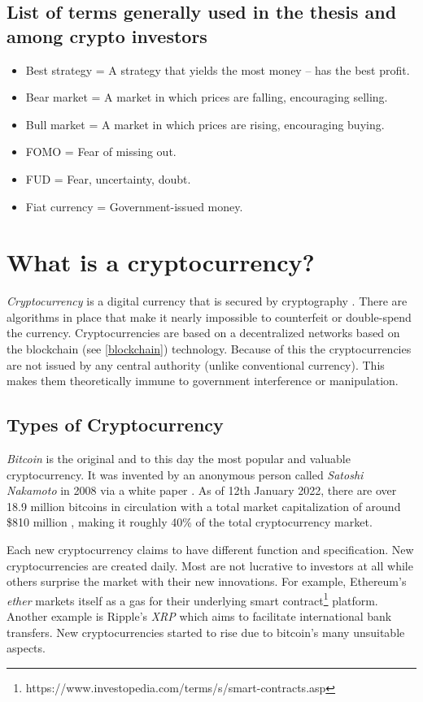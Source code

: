 \subsection*{List of terms generally used in the thesis and among crypto investors}
\begin{itemize}
    \item Best strategy = A strategy that yields the most money -- has the best profit.
    \item Bear market = A market in which prices are falling, encouraging selling. 
    \item Bull market = A market in which prices are rising, encouraging buying.
    \item FOMO = Fear of missing out.
    \item FUD = Fear, uncertainty, doubt.
    \item Fiat currency = Government-issued money.
\end{itemize}

\section{What is a cryptocurrency?}
\emph{Cryptocurrency} is a digital currency that is secured by cryptography \cite{investopedia-cryptocurrency}. There are algorithms in place that make it nearly impossible to counterfeit or double-spend the currency. Cryptocurrencies are based on a decentralized networks based on the blockchain (see \ref{blockchain}) technology. Because of this the cryptocurrencies are not issued by any central authority (unlike conventional currency). This makes them theoretically immune to government interference or manipulation.

\subsection*{Types of Cryptocurrency}
\emph{Bitcoin} is the original and to this day the most popular and valuable cryptocurrency. It was invented by an anonymous person called \emph{Satoshi Nakamoto} in 2008 via a white paper \cite{satoshi}. As of 12th January 2022, there are over 18.9 million bitcoins in circulation with a total market capitalization of around \$810 million \cite{coinmarketcap}, making it roughly 40\% of the total cryptocurrency market.

Each new cryptocurrency claims to have different function and specification. New cryptocurrencies are created daily. Most are not lucrative to investors at all while others surprise the market with their new innovations. For example, Ethereum's \emph{ether} markets itself as a gas for their underlying smart contract\footnote{https://www.investopedia.com/terms/s/smart-contracts.asp} platform. Another example is Ripple's \emph{XRP} which aims to facilitate international bank transfers. New cryptocurrencies started to rise due to bitcoin's many unsuitable aspects.

